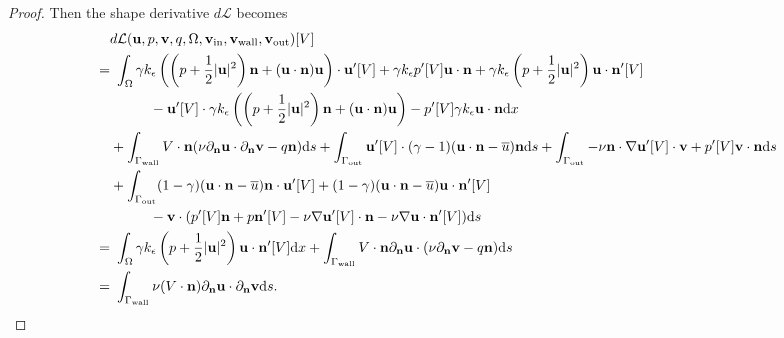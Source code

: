 \documentclass[oneside,11pt]{book}
\numberwithin{equation}{section}
\begin{document}
\begin{proof}
    Then the shape derivative $d\mathcal{L}$ becomes
    \begin{align}
        &d\mathcal{L}({\bf u},p,{\bf v},q,\Omega,{\bf v}_{\rm in},{\bf v}_{\rm wall},{\bf v}_{\rm out})[V]\\
        =&\ \int_\Omega \gamma k_\epsilon\left(\left(p + \frac{1}{2}|{\bf u}|^2\right){\bf n} + ({\bf u}\cdot{\bf n}){\bf u}\right)\cdot{\bf u}'[V] + \gamma k_\epsilon p'[V]{\bf u}\cdot{\bf n} + \gamma k_\epsilon\left(p + \frac{1}{2}|{\bf u}|^2\right){\bf u}\cdot{\bf n}'[V]\\
        &\hspace{1cm}-{\bf u}'[V]\cdot\gamma k_\epsilon\left(\left(p + \frac{1}{2}|{\bf u}|^2\right){\bf n} + ({\bf u}\cdot{\bf n}){\bf u}\right) - p'[V]\gamma k_\epsilon{\bf u}\cdot{\bf n}{\rm d}x\\
        &+ \int_{\Gamma_{\rm wall}} V\cdot{\bf n}(\nu\partial_{\bf n}{\bf u}\cdot\partial_{\bf n}{\bf v} - q{\bf n}){\rm d}s + \int_{\Gamma_{\rm out}} {\bf u}'[V]\cdot(\gamma - 1)({\bf u}\cdot{\bf n} - \overline{u}){\bf n}{\rm d}s + \int_{\Gamma_{\rm out}} -\nu{\bf n}\cdot\nabla{\bf u}'[V]\cdot{\bf v} + p'[V]{\bf v}\cdot{\bf n}{\rm d}s\\
        &+ \int_{\Gamma_{\rm out}} (1 - \gamma)({\bf u}\cdot{\bf n} - \overline{u}){\bf n}\cdot{\bf u}'[V] + (1 - \gamma)({\bf u}\cdot{\bf n} - \overline{u}){\bf u}\cdot{\bf n}'[V]\\
        &\hspace{1cm} -{\bf v}\cdot(p'[V]{\bf n} + p{\bf n}'[V] - \nu\nabla{\bf u}'[V]\cdot{\bf n} - \nu\nabla{\bf u}\cdot{\bf n}'[V]){\rm d}s\\
        =&\ \int_\Omega \gamma k_\epsilon\left(p + \frac{1}{2}|{\bf u}|^2\right){\bf u}\cdot{\bf n}'[V]{\rm d}x + \int_{\Gamma_{\rm wall}} V\cdot{\bf n}\partial_{\bf n}{\bf u}\cdot(\nu\partial_{\bf n}{\bf v} - q{\bf n}){\rm d}s\\
        =&\ \int_{\Gamma_{\rm wall}} \nu(V\cdot{\bf n})\partial_{\bf n}{\bf u}\cdot\partial_{\bf n}{\bf v}{\rm d}s.
    \end{align}
\end{proof}
\end{document}
